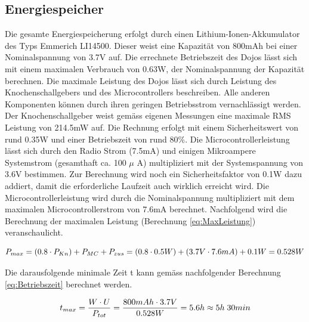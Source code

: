\subsection{Energiespeicher}\label{sec:energiespeicher}

Die gesamte Energiespeicherung erfolgt durch einen Lithium-Ionen-Akkumulator des Typs Emmerich LI14500. Dieser weist eine Kapazität von 800mAh bei einer Nominalspannung von 3.7V auf. Die errechnete Betriebszeit des Dojos lässt sich mit einem maximalen Verbrauch von 0.63W, der Nominalspannung der Kapazität berechnen. Die maximale Leistung des Dojos lässt sich durch Leistung des Knochenschallgebers und des Microcontrollers beschreiben. Alle anderen Komponenten können durch ihren geringen Betriebsstrom vernachlässigt werden. Der Knochenschallgeber weist gemäss eigenen Messungen eine maximale RMS Leistung von 214.5mW auf. Die Rechnung erfolgt mit einem Sicherheitswert von rund 0.35W und einer Betriebszeit von rund 80$\%$. Die Microcontrollerleistung lässt sich durch den Radio Strom (7.5mA) und einigen Mikroampere Systemstrom (gesamthaft ca. 100 $\mu$ A) multipliziert mit der Systemspannung von 3.6V bestimmen. Zur Berechnung wird noch ein Sicherheitsfaktor von 0.1W dazu addiert, damit die erforderliche Laufzeit auch wirklich erreicht wird. Die Microcontrollerleistung wird durch die Nominalspannung multipliziert mit dem maximalen Microcontrollerstrom von 7.6mA berechnet. Nachfolgend wird die Berechnung der maximalen Leistung (Berechnung \ref{eq:MaxLeistung}) veranschaulicht.

\begin{equation}
\centering
P_{max}=\left(0.8\cdot P_{Kn}\right)+P_{MC}+P_{zus}=(0.8\cdot 0.5W)+(3.7V \cdot 7.6mA)+0.1W=0.528W
\label{eq:MaxLeistung}
\end{equation}

Die darausfolgende minimale Zeit t kann gemäss nachfolgender Berechnung \ref{eq:Betriebszeit} berechnet werden.

\begin{equation}
\centering
t_{max}=\frac{W\cdot U}{P_{tot}}=\frac{800mAh \cdot 3.7V}{0.528W}=5.6h\approx 5h \thickspace 30min
\label{eq:Betriebszeit}
\end{equation}




